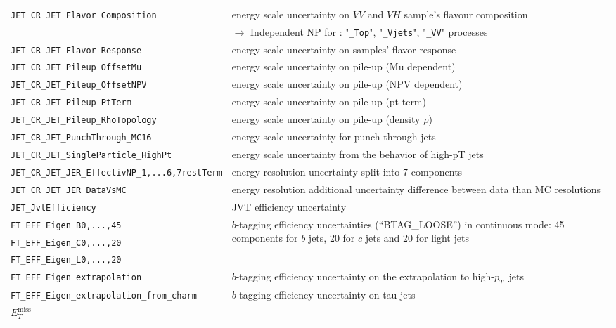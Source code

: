 \begin{table}
{\begin{tabular}{ll}
      \texttt{JET\_CR\_JET\_Flavor\_Composition} & energy scale uncertainty on $VV$ and $VH$ sample's flavour composition \\
                                         & {$\rightarrow$ Independent NP for : "\texttt{\_Top}", "\texttt{\_Vjets}", "\texttt{\_VV}" processes } \\
      \texttt{JET\_CR\_JET\_Flavor\_Response} & energy scale uncertainty on samples' flavor response \\
      \texttt{JET\_CR\_JET\_Pileup\_OffsetMu} & energy scale uncertainty on pile-up (Mu dependent) \\
      \texttt{JET\_CR\_JET\_Pileup\_OffsetNPV} & energy scale uncertainty on pile-up (NPV dependent) \\
      \texttt{JET\_CR\_JET\_Pileup\_PtTerm} & energy scale uncertainty on pile-up (pt term) \\
      \texttt{JET\_CR\_JET\_Pileup\_RhoTopology} & energy scale uncertainty on pile-up (density $\rho$) \\
      \texttt{JET\_CR\_JET\_PunchThrough\_MC16} & energy scale uncertainty for punch-through jets \\
      \texttt{JET\_CR\_JET\_SingleParticle\_HighPt} & energy scale uncertainty from the behavior of high-pT jets \\
      \texttt{JET\_CR\_JET\_JER\_EffectivNP\_1,...6,7restTerm} & energy resolution uncertainty split into 7 components \\
      \texttt{JET\_CR\_JET\_JER\_DataVsMC} & energy resolution additional uncertainty difference between data than MC resolutions \\
      \texttt{JET\_JvtEfficiency} & JVT efficiency uncertainty \\
      \texttt{FT\_EFF\_Eigen\_B0,...,45} & \multirow{3}{*}{\parbox{11cm}{$b$-tagging efficiency uncertainties (``BTAG\_LOOSE'') in continuous mode: 45 components for $b$ jets, 20 for $c$ jets and 20 for light jets}} \\
      \texttt{FT\_EFF\_Eigen\_C0,...,20} &\\
      \texttt{FT\_EFF\_Eigen\_L0,...,20} &\\
      \texttt{FT\_EFF\_Eigen\_extrapolation} & $b$-tagging efficiency uncertainty on the extrapolation to high-$p_T$\ jets \\
      \texttt{FT\_EFF\_Eigen\_extrapolation\_from\_charm} & $b$-tagging efficiency uncertainty on tau jets \\
      {\bfseries $E_T^{\text{miss}}$}&\\

\end{tabular}}
\end{table}
